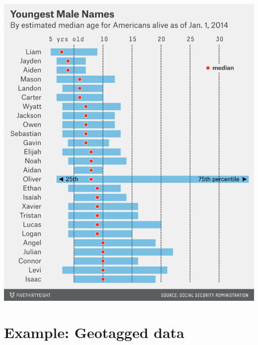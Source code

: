 \documentclass[slidestop,compress,mathserif,12pt,t,professionalfonts,xcolor=table]{beamer}
\begin{document}
\begin{frame}
\frametitle{}

\begin{center}
\includegraphics[width=\textwidth]{figures/silver-feature-youngest-men-names3.png}
\end{center}

\end{frame}


\section{Example: Geotagged data}

\end{document}
